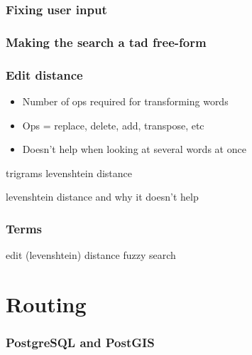 \documentclass[14pt]{beamer}
\begin{document}
\begin{frame}
  \frametitle{Fixing user input}
\end{frame}

\begin{frame}
  \frametitle{Making the search a tad free-form}
\end{frame}



\begin{frame}
  \frametitle{Edit distance}
  \begin{itemize}
  \item Number of ops required for transforming words
  \item Ops = replace, delete, add, transpose, etc
  \item Doesn't help when looking at several words at once
  \end{itemize}
  trigrams
  levenshtein distance
\end{frame}

\begin{frame}
  levenshtein distance and why it doesn't help
\end{frame}

\begin{frame}
  \frametitle{Terms}
  edit (levenshtein) distance
  fuzzy search
\end{frame}










\section{Routing}

\begin{frame}
  \frametitle{PostgreSQL and PostGIS}

\end{frame}
\end{document}
